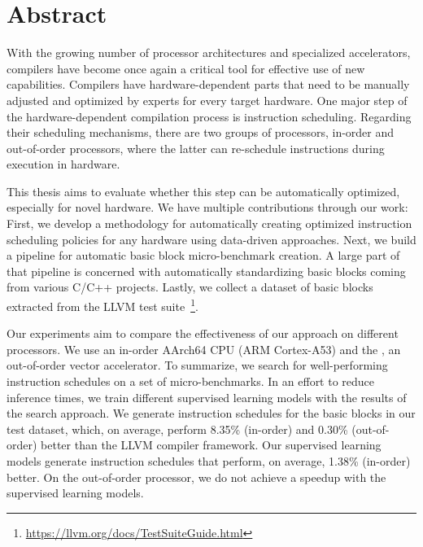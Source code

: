\chapter*{Abstract}
With the growing number of processor architectures and specialized accelerators, compilers have become once again a critical tool for effective use of new capabilities.
Compilers have hardware-dependent parts that need to be manually adjusted and optimized by experts for every target hardware.
One major step of the hardware-dependent compilation process is instruction scheduling.
Regarding their scheduling mechanisms, there are two groups of processors, in-order and out-of-order processors, where the latter can re-schedule instructions during execution in hardware.

This thesis aims to evaluate whether this step can be automatically optimized, especially for novel hardware.
We have multiple contributions through our work:
First, we develop a methodology for automatically creating optimized instruction scheduling policies for any hardware using data-driven approaches.
Next, we build a pipeline for automatic basic block micro-benchmark creation.
A large part of that pipeline is concerned with automatically standardizing basic blocks coming from various C/C++ projects.
Lastly, we collect a dataset of basic blocks extracted from the LLVM test suite~\footnote{\url{https://llvm.org/docs/TestSuiteGuide.html}}.

Our experiments aim to compare the effectiveness of our approach on different processors.
We use an in-order AArch64 CPU (ARM Cortex-A53) and the \aurora{}, an out-of-order vector accelerator.
To summarize, we search for well-performing instruction schedules on a set of micro-benchmarks.
In an effort to reduce inference times, we train different supervised learning models with the results of the search approach.
We generate instruction schedules for the basic blocks in our test dataset, which, on average, perform 8.35\% (in-order) and 0.30\% (out-of-order) better than the LLVM compiler framework.
Our supervised learning models generate instruction schedules that perform, on average, 1.38\% (in-order) better.
On the out-of-order processor, we do not achieve a speedup with the supervised learning models.

